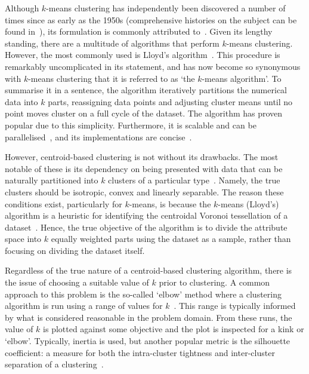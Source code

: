 Although \(k\)-means clustering has independently been discovered a number of
times since as early as the 1950s (comprehensive histories on the subject can be
found in~\cite{Bock2007,Jain2010}), its formulation is commonly attributed
to~\cite{Hartigan1979}. Given its lengthy standing, there are a multitude of
algorithms that perform \(k\)-means clustering. However, the most commonly used
is Lloyd's algorithm~\cite{Lloyd1982}. This procedure is remarkably
uncomplicated in its statement, and has now become so synonymous with
\(k\)-means clustering that it is referred to as `the \(k\)-means algorithm'. To
summarise it in a sentence, the algorithm iteratively partitions the numerical
data into \(k\) parts, reassigning data points and adjusting cluster means until
no point moves cluster on a full cycle of the dataset. The algorithm has proven
popular due to this simplicity. Furthermore, it is scalable and can be
parallelised~\cite{Bahmani2012}, and its implementations are
concise~\cite{Olafsson2008,Wu2009}.

However, centroid-based clustering is not without its drawbacks. The most
notable of these is its dependency on being presented with data that can be
naturally partitioned into \(k\) clusters of a particular
type~\cite{Ostrovsky2013}. Namely, the true clusters should be isotropic, convex
and linearly separable. The reason these conditions exist, particularly for
\(k\)-means, is because the \(k\)-means (Lloyd's) algorithm is a heuristic for
identifying the centroidal Voronoi tessellation of a dataset~\cite{Du2006}.
Hence, the true objective of the algorithm is to divide the attribute space into
\(k\) equally weighted parts using the dataset as a sample, rather than focusing
on dividing the dataset itself.

Regardless of the true nature of a centroid-based clustering algorithm, there is
the issue of choosing a suitable value of \(k\) prior to clustering. A common
approach to this problem is the so-called `elbow' method where a clustering
algorithm is run using a range of values for \(k\)~\cite{Aggarwal2013}. This
range is typically informed by what is considered reasonable in the problem
domain. From these runs, the value of \(k\) is plotted against some objective
and the plot is inspected for a kink or `elbow'. Typically, inertia is used, but
another popular metric is the silhouette coefficient: a measure for both the
intra-cluster tightness and inter-cluster separation of a
clustering~\cite{Rousseeuw1987}.

